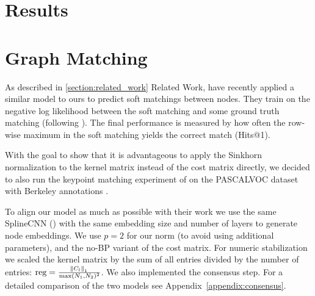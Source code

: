 \section{Results}






\section{Graph Matching}

As described in \ref{section:related_work} Related Work, \cite{fey2020_update} have recently applied a similar model to ours to predict soft matchings between nodes. They train on the negative log likelihood between the soft matching and some ground truth matching (following \citealp{wang2019}). The final performance is measured by how often the row-wise maximum in the soft matching yields the correct match (Hits@1).

With the goal to show that it is advantageous to apply the Sinkhorn normalization to the kernel matrix instead of the cost matrix directly, we decided to also run the keypoint matching experiment of \cite{fey2020_update} on the PASCALVOC  dataset \cite{pascal2010} with Berkeley annotations \cite{annotations2009}.

To align our model as much as possible with their work we use the same SplineCNN (\citealp{spline2018}) with the same embedding size and number of layers to generate node embeddings. We use $p=2$ for our norm (to avoid using additional parameters), and the no-BP variant of the cost matrix. For numeric stabilization we scaled the kernel matrix by the sum of all entries divided by the number of entries: $\text{reg} = \frac{\norm{C_l}_1}{\max(N_1,N_2)^2}$. We also implemented the consensus step. For a detailed comparison of the two models see \mbox{Appendix \ref{appendix:consensus}}.


